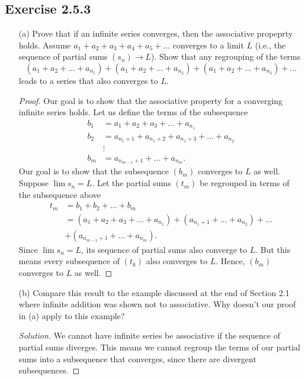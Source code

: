 \subsection{Exercise 2.5.3}
\begin{enumerate}
    \item[(a)] Prove that if an infinite series converges, then the associative propeprty holds. Assume \(a_1 + a_2 + a_3 + a_4 + a_5 + ...\) converges to a limit \(L \) (i.e., the sequence of partial sums \((s_n) \to L \)). Show that any regrouping of the terms 
        \[ (a_1 + a_2 + ... + a_{n_1}) + (a_1 + a_2 + ... + a_{n_2}) + (a_1 + a_2 + ... + a_{n_3}) + ...\]
        leads to a series that also converges to \(L\).
\begin{proof}
Our goal is to show that the associative property for a converging infinite series holds. Let us define the terms of the subsequence 
\begin{align*}
    b_1 &= a_1 + a_2 + a_3 + ... + a_{n_1} \\
    b_2 &= a_{n_1 + 1}  + a_{n_1 + 2} + a_{n_1 + 3} + \dots + a_{n_2} \\
        &\vdots  \\
    b_m &= a_{n_{m-1}+1} + \dots + a_{n_m}.
\end{align*}
Our goal is to show that the subsequence \((b_m)\) converges to \(L \) as well. Suppose \( \lim s_n = L \). Let the partial sums \( (t_m)\) be regrouped in terms of the subsequence above
\begin{align*}
    t_m&= b_1 + b_2 + \dots + b_m \\
       &= (a_1 + a_2 + a_3 + ... + a_{n_1}) + (a_{n_1 + 1} + \dots + a_{n_2}) + \dots \\
       &+ ( a_{n_{m-1}+1} + \dots + a_{n_m}).
\end{align*}
Since \( \lim s_n = L \), its sequence of partial sums also converge to \(L\). But this means every subsequence of \( (t_k)\) also converges to \(L \). Hence, \((b_m)\) converges to \(L \) as well.
\end{proof}
\item[(b)] Compare this result to the example discussed at the end of Section 2.1 where infinite addition was shown not to associative. Why doesn't our proof in (a) apply to this example?
    \begin{proof}[Solution]
    We cannot have infinite series be associative if the sequence of partial sums diverges. This means we cannot regroup the terms of our partial sums into a subsequence that converges, since there are divergent subsequences. 
    \end{proof}
\end{enumerate}

